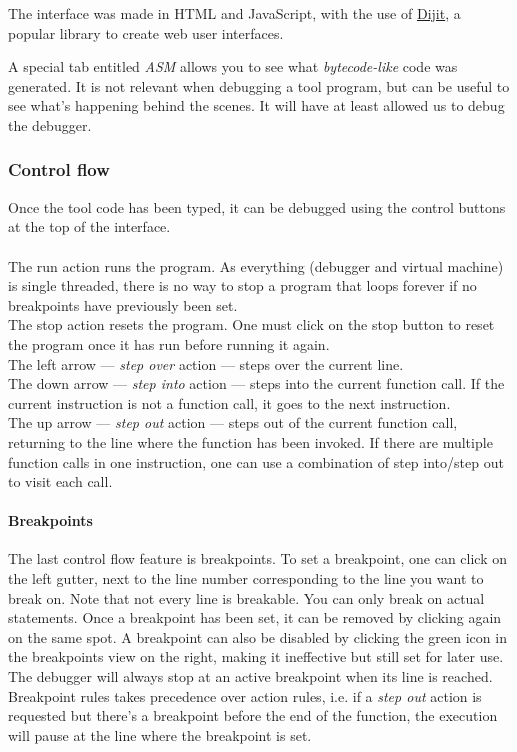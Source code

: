 The interface was made in HTML and JavaScript, with the use of \href{http://dojotoolkit.org/reference-guide/1.10/dijit/}{Dijit}, a popular library to create web user interfaces.

A special tab entitled \textit{ASM} allows you to see what \textit{bytecode-like} code was generated. It is not relevant when debugging a tool program, but can be useful to see what's happening behind the scenes. It will have at least allowed us to debug the debugger.

\subsubsection{Control flow}

Once the tool code has been typed, it can be debugged using the control buttons at the top of the interface.

\paragraph{}
The run action runs the program. As everything (debugger and virtual machine) is single threaded, there is no way to stop a program that loops forever if no breakpoints have previously been set.\\
The stop action resets the program. One must click on the stop button to reset the program once it has run before running it again.\\
The left arrow --- \textit{step over} action --- steps over the current line. \\
The down arrow --- \textit{step into} action --- steps into the current function call. If the current instruction is not a function call, it goes to the next instruction.\\
The up arrow --- \textit{step out} action --- steps out of the current function call, returning to the line where the function has been invoked.
If there are multiple function calls in one instruction, one can use a combination of step into/step out to visit each call.

\paragraph{Breakpoints}
The last control flow feature is breakpoints. To set a breakpoint, one can click on the left gutter, next to the line number corresponding to the line you want to break on. Note that not every line is breakable. You can only break on actual statements. Once a breakpoint has been set, it can be removed by clicking again on the same spot. A breakpoint can also be disabled by clicking the green icon in the breakpoints view on the right, making it ineffective but still set for later use. The debugger will always stop at an active breakpoint when its line is reached.
\\
Breakpoint rules takes precedence over action rules, i.e. if a \textit{step out} action is requested but there's a breakpoint before the end of the function, the execution will pause at the line where the breakpoint is set.
